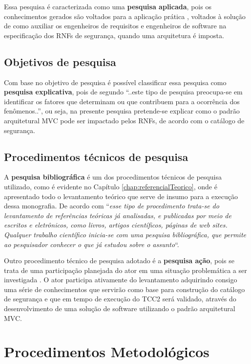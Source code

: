 Essa pesquisa é caracterizada como uma \textbf{pesquisa aplicada}, pois os conhecimentos gerados são voltados para a aplicação prática \cite{gerhardt2009metodos}, voltados à solução de como auxiliar os engenheiros de requisitos e engenheiros de software na especificação dos RNFs de segurança, quando uma arquitetura é imposta. 

\subsection{Objetivos de pesquisa}

Com base no objetivo de pesquisa é possível classificar essa pesquisa como \textbf{pesquisa explicativa}, pois de segundo \cite{gil2002elaborar} “..este tipo de pesquisa preocupa-se em identificar os fatores que determinam ou que contribuem para a ocorrência dos fenômenos..”, ou seja, na presente pesquisa pretende-se explicar como o padrão arquitetural MVC pode ser impactado pelos RNFs, de acordo com o catálogo de segurança.

\subsection{Procedimentos técnicos de pesquisa}

A \textbf{pesquisa bibliográfica} é um dos procedimentos técnicos de pesquisa utilizado, como é evidente no Capítulo \ref{chap:referencialTeorico}, onde é apresentado todo o levantamento teórico que serve de insumo para a execução dessa monografia. De acordo com \cite[p.35]{fonseca2002metodologia} “\textit{esse tipo de procedimento trata-se do levantamento de referências teóricas já analisadas, e publicadas por meio de escritos e eletrônicos, como livros, artigos científicos, páginas de web sites. Qualquer trabalho científico inicia-se com uma pesquisa bibliográfica, que permite ao pesquisador conhecer o que já estudou sobre o assunto}“.
 
Outro procedimento técnico de pesquisa adotado é a \textbf{pesquisa ação}, pois se trata de uma participação planejada do ator em uma situação problemática a ser investigada \cite{fonseca2002metodologia}. O ator participa ativamente do levantamento adquirindo consigo uma série de conhecimentos que servirão como base para construção do catálogo de segurança e que em tempo de execução do TCC2 será validado, através do desenvolvimento de uma solução de software utilizando o padrão arquitetural MVC. 

\section{Procedimentos Metodológicos}
\label{sec:procedimentosMetodológicos}

